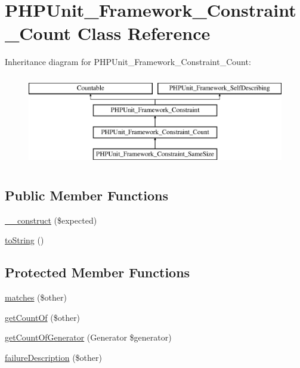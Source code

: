 \hypertarget{class_p_h_p_unit___framework___constraint___count}{}\section{P\+H\+P\+Unit\+\_\+\+Framework\+\_\+\+Constraint\+\_\+\+Count Class Reference}
\label{class_p_h_p_unit___framework___constraint___count}
Inheritance diagram for P\+H\+P\+Unit\+\_\+\+Framework\+\_\+\+Constraint\+\_\+\+Count\+:\begin{figure}[H]
\begin{center}
\leavevmode
\includegraphics[height=4.000000cm]{class_p_h_p_unit___framework___constraint___count}
\end{center}
\end{figure}
\subsection*{Public Member Functions}
\begin{DoxyCompactItemize}
\item 
\mbox{\hyperlink{class_p_h_p_unit___framework___constraint___count_a4432014bcb5b5900d382abfaa34d4a31}{\+\_\+\+\_\+construct}} (\$expected)
\item 
\mbox{\hyperlink{class_p_h_p_unit___framework___constraint___count_a5558c5d549f41597377fa1ea8a1cefa3}{to\+String}} ()
\end{DoxyCompactItemize}
\subsection*{Protected Member Functions}
\begin{DoxyCompactItemize}
\item 
\mbox{\hyperlink{class_p_h_p_unit___framework___constraint___count_a9c9c337de483bbdbb9fa249a6c7c9cc5}{matches}} (\$other)
\item 
\mbox{\hyperlink{class_p_h_p_unit___framework___constraint___count_a0adcb17f65887a062d9c917df50df31e}{get\+Count\+Of}} (\$other)
\item 
\mbox{\hyperlink{class_p_h_p_unit___framework___constraint___count_a4a85c1bf3d9b3569fac810b3114f8167}{get\+Count\+Of\+Generator}} (Generator \$generator)
\item 
\mbox{\hyperlink{class_p_h_p_unit___framework___constraint___count_aaabb679273bfb812df4d81c283754a59}{failure\+Description}} (\$other)
\end{DoxyCompactItemize}
